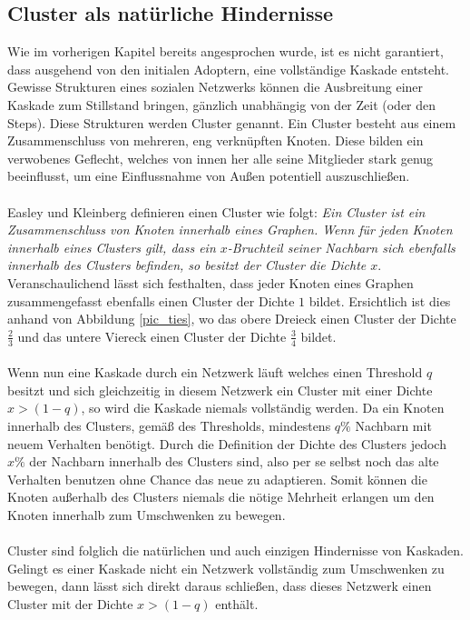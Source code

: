 \documentclass[12pt]{article}
\begin{document}
\subsection{Cluster als natürliche Hindernisse}
\label{ss_cluster}
Wie im vorherigen Kapitel bereits angesprochen wurde, ist es nicht garantiert, dass ausgehend von den initialen Adoptern, eine vollständige Kaskade entsteht. Gewisse Strukturen eines sozialen Netzwerks können die Ausbreitung einer Kaskade zum Stillstand bringen, gänzlich unabhängig von der Zeit (oder den Steps). Diese Strukturen werden Cluster genannt. Ein Cluster besteht aus einem Zusammenschluss von mehreren, eng verknüpften Knoten. Diese bilden ein verwobenes Geflecht, welches von innen her alle seine Mitglieder stark genug beeinflusst, um eine Einflussnahme von Außen potentiell auszuschließen.\\\\
Easley und Kleinberg \cite{Easly10} definieren einen Cluster wie folgt: \emph{Ein Cluster ist ein Zusammenschluss von Knoten innerhalb eines Graphen. Wenn für jeden Knoten innerhalb eines Clusters gilt, dass ein $x$-Bruchteil seiner Nachbarn sich ebenfalls innerhalb des Clusters befinden, so besitzt der Cluster die Dichte $x$}. Veranschaulichend lässt sich festhalten, dass jeder Knoten eines Graphen zusammengefasst ebenfalls einen Cluster der Dichte $1$ bildet. Ersichtlich ist dies anhand von Abbildung \ref{pic_ties}, wo das obere Dreieck einen Cluster der Dichte $\frac{2}{3}$ und das untere Viereck einen Cluster der Dichte $\frac{3}{4}$ bildet.\\\\
Wenn nun eine Kaskade durch ein Netzwerk läuft welches einen Threshold $q$ besitzt und sich gleichzeitig in diesem Netzwerk ein Cluster mit einer Dichte $x > (1-q)$, so wird die Kaskade niemals vollständig werden. Da ein Knoten innerhalb des Clusters, gemäß des Thresholds, mindestens $q\%$ Nachbarn mit neuem Verhalten benötigt. Durch die Definition der Dichte des Clusters jedoch $x\%$ der Nachbarn innerhalb des Clusters sind, also per se selbst noch das alte Verhalten benutzen ohne Chance das neue zu adaptieren. Somit können die Knoten außerhalb des Clusters niemals die nötige Mehrheit erlangen um den Knoten innerhalb zum Umschwenken zu bewegen. \\\\
Cluster sind folglich die natürlichen und auch einzigen Hindernisse von Kaskaden. Gelingt es einer Kaskade nicht ein Netzwerk vollständig zum Umschwenken zu bewegen, dann lässt sich direkt daraus schließen, dass dieses Netzwerk einen Cluster mit der Dichte $x > (1-q)$ enthält.
\end{document}
